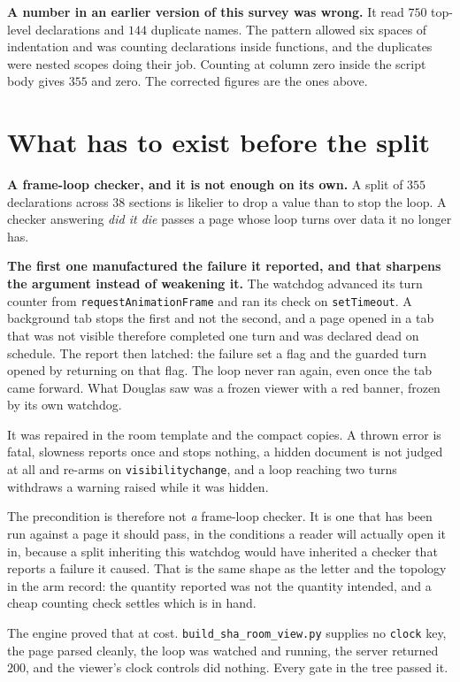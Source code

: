 \textbf{A number in an earlier version of this survey was wrong.} It read \(750\) top-level declarations and \(144\) duplicate names. The pattern allowed six spaces of indentation and was counting declarations inside functions, and the duplicates were nested scopes doing their job. Counting at column zero inside the script body gives \(355\) and zero. The corrected figures are the ones above.

\section{What has to exist before the split}

\textbf{A frame-loop checker, and it is not enough on its own.} A split of \(355\) declarations across \(38\) sections is likelier to drop a value than to stop the loop. A checker answering \emph{did it die} passes a page whose loop turns over data it no longer has.

\textbf{The first one manufactured the failure it reported, and that sharpens the argument instead of weakening it.} The watchdog advanced its turn counter from \texttt{requestAnimationFrame} and ran its check on \texttt{setTimeout}. A background tab stops the first and not the second, and a page opened in a tab that was not visible therefore completed one turn and was declared dead on schedule. The report then latched: the failure set a flag and the guarded turn opened by returning on that flag. The loop never ran again, even once the tab came forward. What Douglas saw was a frozen viewer with a red banner, frozen by its own watchdog.

It was repaired in the room template and the compact copies. A thrown error is fatal, slowness reports once and stops nothing, a hidden document is not judged at all and re-arms on \texttt{visibilitychange}, and a loop reaching two turns withdraws a warning raised while it was hidden.

The precondition is therefore not \emph{a} frame-loop checker. It is one that has been run against a page it should pass, in the conditions a reader will actually open it in, because a split inheriting this watchdog would have inherited a checker that reports a failure it caused. That is the same shape as the letter and the topology in the arm record: the quantity reported was not the quantity intended, and a cheap counting check settles which is in hand.

The engine proved that at cost. \texttt{build\_sha\_room\_view.py} supplies no \texttt{clock} key, the page parsed cleanly, the loop was watched and running, the server returned \(200\), and the viewer's clock controls did nothing. Every gate in the tree passed it.

